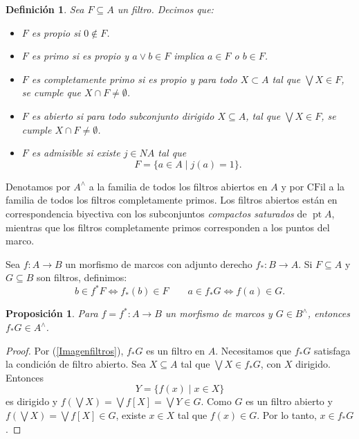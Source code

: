 \documentclass[12pt]{article}
\newtheorem{dfn}[thm]{Definición}
\newtheorem{prop}[thm]{Proposición}
\DeclareMathOperator{\pt}{pt}
\begin{document}
\begin{dfn}\label{tfiltros}
Sea $F\subseteq A$ un filtro. Decimos que:
\begin{itemize}
\item $F$ es \emph{propio} si $0\notin F$.
\item $F$ es \emph{primo} si es propio y $a\vee b\in F$ implica $a\in F$ o $b\in F$.
\item $F$ es \emph{completamente primo} si es propio y para todo $X\subset A$ tal que $\bigvee X\in F$, se cumple que $X\cap F\neq \emptyset$.
\item $F$ es \emph{abierto} si para todo subconjunto dirigido $X\subseteq A$, tal que $\bigvee X\in F$, se cumple $X\cap F\neq \emptyset$.
\item $F$ es \emph{admisible} si existe $j\in NA$ tal que 
\[
F=\{a\in A\mid j(a)=1\}.
\]
\end{itemize}
\end{dfn}

Denotamos por $A^\wedge$ a la familia de todos los filtros abiertos en $A$ y por $\text{CFil}$ a la familia de todos los filtros completamente primos. Los filtros abiertos están en correspondencia biyectiva con los subconjuntos 
\emph{compactos saturados} de $\pt A$, mientras que los filtros completamente primos corresponden a los puntos del marco.

Sea $f\colon A\to B$ un morfismo de marcos con adjunto derecho $f_*\colon B\to A$. Si $F\subseteq A$ y $G\subseteq B$ son filtros, definimos:
\begin{equation}\label{Imagenfiltros}
b\in f^*F \Longleftrightarrow f_*(b)\in F\qquad a\in f_*G \Longleftrightarrow f(a)\in G.
\end{equation}

\begin{prop}\label{fF}
Para $f=f^*\colon A\to B$ un morfismo de marcos y $G\in B^\wedge$, entonces $f_*G\in A^\wedge$.
\end{prop}

\begin{proof}
Por (\ref{Imagenfiltros}), $f_*G$ es un filtro en $A$. Necesitamos que $f_*G$ satisfaga la condición de filtro abierto. Sea $X\subseteq A$ tal que $\bigvee X\in f_*G$, con $X$ dirigido. Entonces
\[
Y=\{f(x)\mid x\in X\}
\] 
es dirigido y $f(\bigvee X)=\bigvee f[X]=\bigvee Y\in G$. Como $G$ es un filtro abierto y $f(\bigvee X)=\bigvee f[X]\in G$, existe $x\in X$ tal que $f(x)\in G$. Por lo tanto, $x\in f_*G$.
\end{proof}
\end{document}
